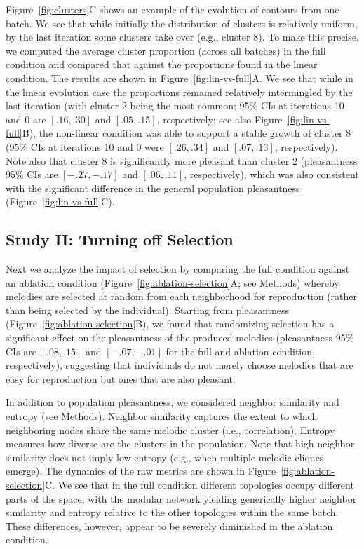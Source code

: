 \documentclass[10pt,letterpaper]{article}
\begin{document}
Figure~\ref{fig:clusters}C shows an example of the evolution of contours from one batch. We see that while initially the distribution of clusters is relatively uniform, by the last iteration some clusters take over (e.g., cluster 8). To make this precise, we computed the average cluster proportion (across all batches) in the full condition and compared that against the proportions found in the linear condition. The results are shown in Figure~\ref{fig:lin-vs-full}A. We see that while in the linear evolution case the proportions remained relatively intermingled by the last iteration (with cluster 2 being the most common; 95\% CIs at iterations 10 and 0 are $[.16,.30]$ and $[.05,.15]$, respectively; see also Figure~\ref{fig:lin-vs-full}B), the non-linear condition was able to support a stable growth of cluster 8 (95\% CIs at iterations 10 and 0 were $[.26,.34]$ and $[.07,.13]$, respectively). Note also that cluster 8 is significantly more pleasant than cluster 2 (pleasantness 95\% CIs are $[-.27,-.17]$ and $[.06,.11]$, respectively), which was also consistent with the significant difference in the general population pleasantness (Figure~\ref{fig:lin-vs-full}C).

\subsection{Study II: Turning off Selection}
Next we analyze the impact of selection by comparing the full condition against an ablation condition (Figure~\ref{fig:ablation-selection}A; see Methods) whereby melodies are selected at random from each neighborhood for reproduction (rather than being selected by the individual). Starting from pleasantness (Figure~\ref{fig:ablation-selection}B), we found that randomizing selection has a significant effect on the pleasantness of the produced melodies (pleasantness 95\% CIs are $[.08,.15]$ and $[-.07,-.01]$ for the full and ablation condition, respectively), suggesting that individuals do not merely choose melodies that are easy for reproduction but ones that are also pleasant.

In addition to population pleasantness, we considered neighbor similarity and entropy (see Methods). Neighbor similarity captures the extent to which neighboring nodes share the same melodic cluster (i.e., correlation). Entropy measures how diverse are the clusters in the population. Note that high neighbor similarity does not imply low entropy (e.g., when multiple melodic cliques emerge). The dynamics of the raw metrics are shown in Figure~\ref{fig:ablation-selection}C. We see that in the full condition different topologies occupy different parts of the space, with the modular network yielding generically higher neighbor similarity and entropy relative to the other topologies within the same batch. These differences, however, appear to be severely diminished in the ablation condition.
\end{document}
